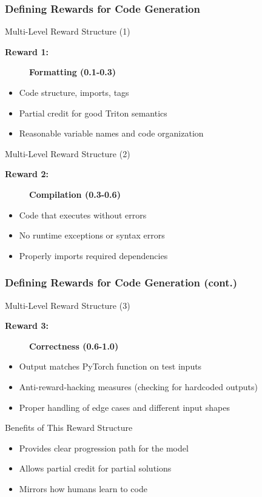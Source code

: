 \documentclass[aspectratio=169]{beamer}
\begin{document}
\begin{frame}
	\frametitle{Defining Rewards for Code Generation}
	\begin{block}{Multi-Level Reward Structure (1)}
		\begin{description}
			\item[\textbf{Reward 1:}] \textbf{Formatting (0.1-0.3)}
		\end{description}
		\begin{itemize}
			\item Code structure, imports, tags
			\item Partial credit for good Triton semantics
			\item Reasonable variable names and code organization
		\end{itemize}
	\end{block}
	\begin{block}{Multi-Level Reward Structure (2)}
		\begin{description}
			\item[\textbf{Reward 2:}] \textbf{Compilation (0.3-0.6)}
		\end{description}
		\begin{itemize}
			\item Code that executes without errors
			\item No runtime exceptions or syntax errors
			\item Properly imports required dependencies
		\end{itemize}
	\end{block}
\end{frame}

\begin{frame}
	\frametitle{Defining Rewards for Code Generation (cont.)}
	\begin{block}{Multi-Level Reward Structure (3)}
		\begin{description}
			\item[\textbf{Reward 3:}] \textbf{Correctness (0.6-1.0)}
		\end{description}
	\end{block}
	\begin{itemize}
		\item Output matches PyTorch function on test inputs
		\item Anti-reward-hacking measures (checking for hardcoded outputs)
		\item Proper handling of edge cases and different input shapes
	\end{itemize}
	\vspace{0.5em}
	\begin{block}{Benefits of This Reward Structure}
		\begin{itemize}
			\item Provides clear progression path for the model
			\item Allows partial credit for partial solutions
			\item Mirrors how humans learn to code
		\end{itemize}
	\end{block}
\end{frame}
\end{document}
